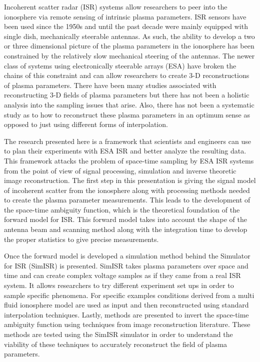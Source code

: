 
Incoherent scatter radar (ISR) systems allow researchers to peer into the ionosphere via remote sensing of intrinsic plasma parameters. ISR sensors have been used since the 1950s and until the past decade were mainly equipped with single dish, mechanically steerable antennas. As such, the ability to develop a two or three dimensional picture of the plasma parameters in the ionosphere has been constrained by the relatively slow mechanical steering of the antennas. The newer class of systems using electronically steerable arrays (ESA) have broken the chains of this constraint and can allow researchers to create 3-D reconstructions of plasma parameters. There have been many studies associated with reconstructing 3-D fields of plasma parameters but there has not been a holistic analysis into the sampling issues that arise. Also, there has not been a systematic study as to how to reconstruct these plasma parameters in an optimum sense as opposed to just using different forms of interpolation.

The research presented here is a framework that scientists and engineers can use to plan their experiments with ESA ISR and better analyze the resulting data. This framework attacks the problem of space-time sampling by ESA ISR systems from the point of view of signal processing, simulation and inverse theoretic image reconstruction. The first step in this presentation is giving the signal model of incoherent scatter from the ionosphere along with processing methods needed to create the plasma parameter measurements. This leads to the development of the space-time ambiguity function, which is the theoretical foundation of the forward model for ISR. This forward model takes into account the shape of the antenna beam and scanning method along with the integration time to develop the proper statistics to give precise measurements.

Once the forward model is developed a simulation method behind the Simulator for ISR (SimISR) is presented. SimISR takes plasma parameters over space and time and can create complex voltage samples as if they came from a real ISR system. It allows researchers to try different experiment set ups in order to sample specific phenomena. For specific examples conditions derived from a multi fluid ionosphere model are used as input and then reconstructed using standard interpolation techniques. Lastly, methods are presented to invert the space-time ambiguity function using techniques from image reconstruction literature. These methods are tested using the SimISR simulator in order to understand the viability of these techniques to accurately reconstruct the field of plasma parameters.
